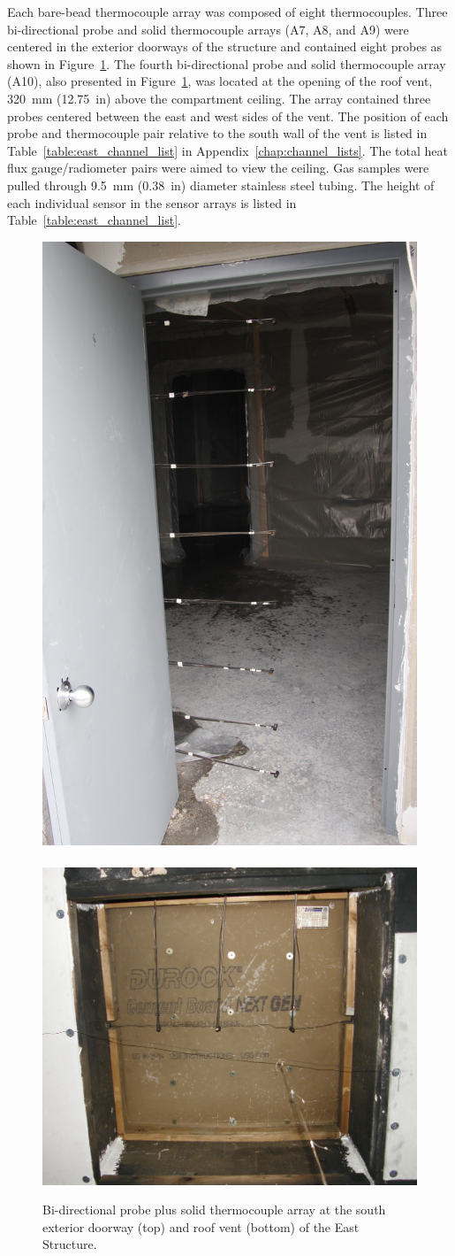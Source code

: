 Each bare-bead thermocouple array was composed of eight thermocouples. Three bi-directional probe and solid thermocouple arrays (A7, A8, and A9) were centered in the exterior doorways of the structure and contained eight probes as shown in Figure~\ref{fig:BDP_arrays}. The fourth bi-directional probe and solid thermocouple array (A10), also presented in Figure~\ref{fig:BDP_arrays}, was located at the opening of the roof vent, 320~mm (12.75~in) above the compartment ceiling. The array contained three probes centered between the east and west sides of the vent. The position of each probe and thermocouple pair relative to the south wall of the vent is listed in Table~\ref{table:east_channel_list} in Appendix~\ref{chap:channel_lists}. The total heat flux gauge/radiometer pairs were aimed to view the ceiling. Gas samples were pulled through 9.5~mm (0.38~in) diameter stainless steel tubing. The height of each individual sensor in the sensor arrays is listed in Table~\ref{table:east_channel_list}.

\begin{figure}
	\centering
	\includegraphics[width=0.45\columnwidth]{Figures/Pictures/doorway_BDPs}
	\\~\\
	\includegraphics[width=0.65\columnwidth]{Figures/Pictures/roof_vent_BDPs}
	\caption[Bi-directional probe plus solid thermocouple arrays in East Structure]{Bi-directional probe plus solid thermocouple array at the south exterior doorway (top) and roof vent (bottom) of the East Structure.}
	\label{fig:BDP_arrays}
\end{figure}

